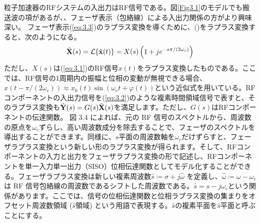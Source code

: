 \documentclass[book]{jlreq}
\begin{document}
粒子加速器のRFシステムの入出力はRF信号である。図\ref{Fig3.1}のモデルでも搬送波の項があるが、、フェーザ表示（包絡線）による入出力関係の方がより興味深い。
フェーザ表示(\ref{eq:3.3})のラプラス変換を導くために、()をラプラス変換すると、次のようになる。
%
\begin{equation}
    \tilde{\vb{X}}(s) = \mathcal{L}\{\tilde{\vb{x}}(t)\} = X(s)\left( 1+j e^{-s\pi / (2\omega_c)}\right)
    \label{eq:3.6}
\end{equation}
%
ただし、$X(s)$は(\ref{eq:3.1})のRF信号$x(t)$をラプラス変換したものである。ここでは、RF信号の1周期内の振幅と位相の変動が無視できる場合、$x(t-\pi/(2\omega_c)) \approx x_0(t)\sin(\omega_c t + \varphi(t))$という近似式を用いている。RFコンポーネントの入出力信号を(\ref{eq:3.2})のような複素時間領域信号で表すと、そのラプラス変換も$\tilde{\vb{Y}}(s) = G(s)\tilde{\vb{X}}(s)$を満足します。ただし、$G(s)$はRFコンポーネントの伝達関数。 図 3.4 によれば、元の RF 信号のスペクトルから、周波数の原点を$\omega_c$ずらし、高い周波数成分を除去することで、フェーザのスペクトルを導出することができます。同様に、$s$平面の周波数軸を$\omega_c$だけずらすと、フェーザラプラス変換という新しい形のラプラス変換が得られます。そして、RFコンポーネントの入力と出力をフェーザラプラス変換の形で記述し、RFコンポーネントを単一入力単一出力（SISO）位相伝達関数としてモデル化することができる。フェーザラプラス変換は新しい複素周波数$\hat{s}\coloneqq\sigma+j\hat{\omega}$ を定義し、$\hat{\omega}\coloneqq\omega-\omega_c$ は RF 信号包絡線の周波数であるシフトした周波数である。$\hat{s}=s-j\omega_c$という関係があります。ここでは、信号の位相伝達関数と位相ラプラス変換の集まりをオフセット周波数領域 ($\hat{s}$領域) という用語で表現する。$\hat{s}$の複素平面を$\hat{s}$平面と呼ぶことにする。
\end{document}
